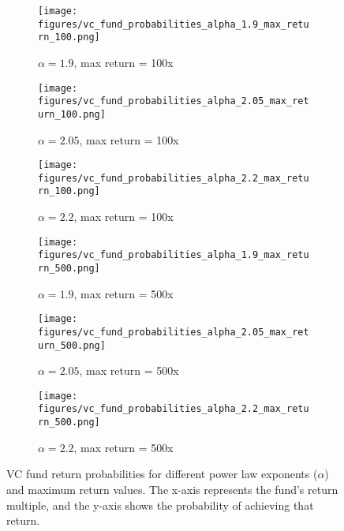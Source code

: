 \documentclass[a4paper, oneside]{discothesis}
\begin{document}
\begin{figure}[htbp]
    \centering
    \begin{subfigure}[b]{0.32\textwidth}
      \centering
      \texttt{[image: figures/vc\_fund\_probabilities\_alpha\_1.9\_max\_return\_100.png]}
      \caption{$\alpha = 1.9$, max return = 100x}
      \label{fig:vc_fund_probabilities_alpha_1.9_max_return_100}
    \end{subfigure}
    \hfill
    \begin{subfigure}[b]{0.32\textwidth}
      \centering
      \texttt{[image: figures/vc\_fund\_probabilities\_alpha\_2.05\_max\_return\_100.png]}
      \caption{$\alpha = 2.05$, max return = 100x}
      \label{fig:vc_fund_probabilities_alpha_2.05_max_return_100}
    \end{subfigure}
    \hfill
    \begin{subfigure}[b]{0.32\textwidth}
      \centering
      \texttt{[image: figures/vc\_fund\_probabilities\_alpha\_2.2\_max\_return\_100.png]}
      \caption{$\alpha = 2.2$, max return = 100x}
      \label{fig:vc_fund_probabilities_alpha_2.2_max_return_100}
    \end{subfigure}
    
    \begin{subfigure}[b]{0.32\textwidth}
      \centering
      \texttt{[image: figures/vc\_fund\_probabilities\_alpha\_1.9\_max\_return\_500.png]}
      \caption{$\alpha = 1.9$, max return = 500x}
      \label{fig:vc_fund_probabilities_alpha_1.9_max_return_500}
    \end{subfigure}
    \hfill
    \begin{subfigure}[b]{0.32\textwidth}
      \centering
      \texttt{[image: figures/vc\_fund\_probabilities\_alpha\_2.05\_max\_return\_500.png]}
      \caption{$\alpha = 2.05$, max return = 500x}
      \label{fig:vc_fund_probabilities_alpha_2.05_max_return_500}
    \end{subfigure}
    \hfill
    \begin{subfigure}[b]{0.32\textwidth}
      \centering
      \texttt{[image: figures/vc\_fund\_probabilities\_alpha\_2.2\_max\_return\_500.png]}
      \caption{$\alpha = 2.2$, max return = 500x}
      \label{fig:vc_fund_probabilities_alpha_2.2_max_return_500}
    \end{subfigure}
    \caption{VC fund return probabilities for different power law exponents ($\alpha$) and maximum return values. The x-axis represents the fund's return multiple, and the y-axis shows the probability of achieving that return.}
    \label{fig:vc_fund_probabilities}
\end{figure}
\end{document}
